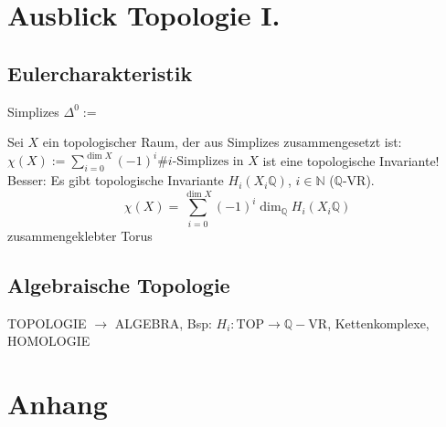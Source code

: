 \section*{Ausblick Topologie I.} %
\label{sec:ausblick}
\subsection*{Eulercharakteristik} %
\label{sub:eulercharakteristik}
Simplizes $\Delta^0 := $

Sei $X$ ein topologischer Raum, der aus Simplizes zusammengesetzt ist:
$\chi(X) := \sum_{i=0}^{\dim X} (-1)^i  \# \text{$i$-Simplizes in $X$} $ ist eine topologische Invariante! Besser: Es gibt topologische Invariante 
$H_i(X_i\mathds{Q})$, $i \in \mathds{N}$ ($\mathds{Q}$-VR). 
\[
	\chi(X) = \sum_{i=0}^{\dim X} (-1)^i \dim_\mathds{Q} H_i(X_i \mathds{Q}) 
\]
zusammengeklebter Torus

\subsection*{Algebraische Topologie} %
\label{sub:algebraische_topologie}
TOPOLOGIE $\to$ ALGEBRA, Bsp: $H_i : \text{TOP} \to \mathds{Q}-\text{VR}$, Kettenkomplexe, HOMOLOGIE



\cleardoubleoddemptypage
\appendix
\section{Anhang} %
\label{sec:anhang}
